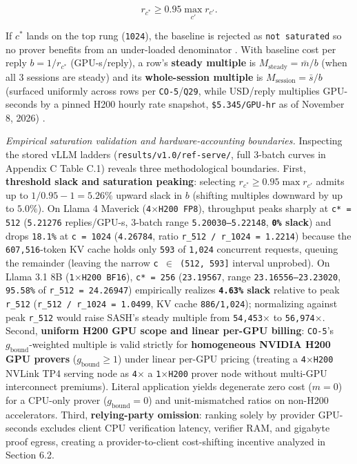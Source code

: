 \documentclass[11pt,letterpaper]{article}
\begin{document}
\[
r_{c^*} \ge 0.95 \max_{c'} r_{c'}.
\]

If $c^*$ lands on the top rung (\texttt{1024}), the baseline is rejected as \texttt{not saturated} so no prover benefits from an under-loaded denominator \cite{iproofs2026}. With baseline cost per reply $b = 1 / r_{c^*}$ (GPU-s/reply), a row's \textbf{steady multiple} is $M_{\text{steady}} = \bar{m} / b$ (when all 3 sessions are steady) and its \textbf{whole-session multiple} is $M_{\text{session}} = \bar{s} / b$ (surfaced uniformly across rows per \texttt{CO-5}/\texttt{Q29}, while USD/reply multiplies GPU-seconds by a pinned H200 hourly rate snapshot, \texttt{\$5.345/\allowbreak{}GPU-\allowbreak{}hr} as of November 8, 2026) \cite{iproofs2026}.

\textit{Empirical saturation validation and hardware-accounting boundaries.} Inspecting the stored vLLM ladders (\texttt{results/\allowbreak{}v1.0/\allowbreak{}ref-\allowbreak{}serve/}, full 3-batch curves in Appendix C Table C.1) reveals three methodological boundaries. First, \textbf{threshold slack and saturation peaking}: selecting $r_{c^*} \ge 0.95 \max r_{c'}$ admits up to $1/0.95 - 1 = 5.26\%$ upward slack in $b$ (shifting multiples downward by up to $5.0\%$). On Llama 4 Maverick (\texttt{4$\times$H200 FP8}), throughput peaks sharply at \texttt{c* = 512} (\texttt{5.21276} replies/GPU-s, 3-batch range \texttt{5.20030--5.22148}, \textbf{\texttt{0\%} slack}) and drops \texttt{18.1\%} at \texttt{c = 1024} (\texttt{4.26784}, ratio \texttt{r\_\allowbreak{}512 / r\_\allowbreak{}1024 = 1.2214}) because the \texttt{607,516}-token KV cache holds only \texttt{593} of \texttt{1,024} concurrent requests, queuing the remainder (leaving the narrow \texttt{c $\in$ (512, 593]} interval unprobed). On Llama 3.1 8B (\texttt{1$\times$H200 BF16}), \texttt{c* = 256} (\texttt{23.19567}, range \texttt{23.16556--23.23020}, \texttt{95.58\%} of \texttt{r\_\allowbreak{}512 = 24.26947}) empirically realizes \textbf{\texttt{4.63\%} slack} relative to peak \texttt{r\_\allowbreak{}512} (\texttt{r\_\allowbreak{}512 / r\_\allowbreak{}1024 = 1.0499}, KV cache \texttt{886/\allowbreak{}1,024}); normalizing against peak \texttt{r\_\allowbreak{}512} would raise SASH's steady multiple from \texttt{54,453$\times$} to \texttt{56,974$\times$}. Second, \textbf{uniform H200 GPU scope and linear per-GPU billing}: \texttt{CO-5}'s $g_{\text{bound}}$-weighted multiple is valid strictly for \textbf{homogeneous NVIDIA H200 GPU provers} ($g_{\text{bound}} \ge 1$) under linear per-GPU pricing (treating a \texttt{4$\times$H200} NVLink TP4 serving node as \texttt{4$\times$} a \texttt{1$\times$H200} prover node without multi-GPU interconnect premiums). Literal application yields degenerate zero cost ($m = 0$) for a CPU-only prover ($g_{\text{bound}} = 0$) and unit-mismatched ratios on non-H200 accelerators. Third, \textbf{relying-party omission}: ranking solely by provider GPU-seconds excludes client CPU verification latency, verifier RAM, and gigabyte proof egress, creating a provider-to-client cost-shifting incentive analyzed in Section 6.2.
\end{document}
